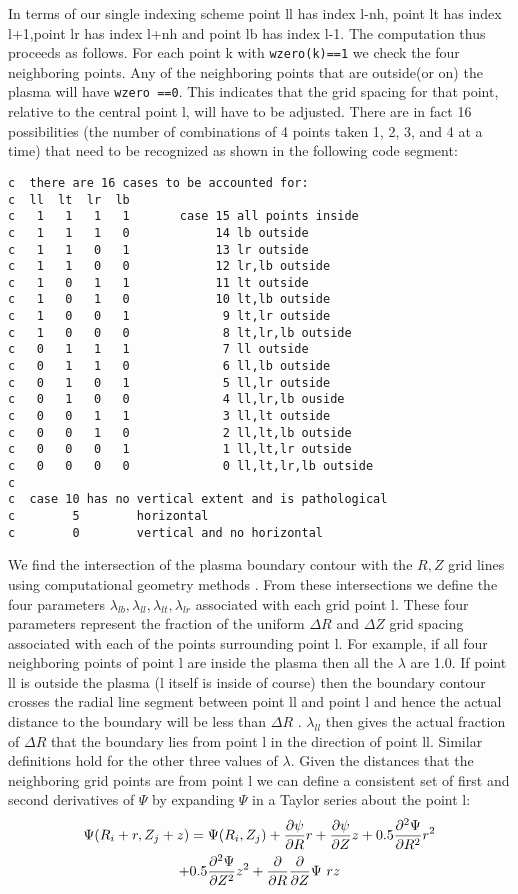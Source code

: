 In terms of our single indexing scheme point ll has
index l-nh, point lt has index l+1,point lr has index l+nh and point lb
has index l-1. The computation thus proceeds as follows. For each
point k with \texttt{wzero(k)==1} we check the four neighboring points. Any of
the neighboring points that are outside(or on)  the plasma will have
\texttt{wzero ==0}. This indicates that the grid spacing for that point,
relative to the central point l, will have to be adjusted. There are
in fact 16 possibilities (the number of combinations of 4 points
taken  1, 2, 3, and 4 at a time) that need to be recognized as shown in
the following code segment:

\tiny
\begin{verbatim}
c  there are 16 cases to be accounted for:
c  ll  lt  lr  lb
c   1   1   1   1       case 15 all points inside
c   1   1   1   0            14 lb outside
c   1   1   0   1            13 lr outside
c   1   1   0   0            12 lr,lb outside
c   1   0   1   1            11 lt outside
c   1   0   1   0            10 lt,lb outside
c   1   0   0   1             9 lt,lr outside
c   1   0   0   0             8 lt,lr,lb outside
c   0   1   1   1             7 ll outside
c   0   1   1   0             6 ll,lb outside
c   0   1   0   1             5 ll,lr outside
c   0   1   0   0             4 ll,lr,lb ouside
c   0   0   1   1             3 ll,lt outside
c   0   0   1   0             2 ll,lt,lb outside
c   0   0   0   1             1 ll,lt,lr outside
c   0   0   0   0             0 ll,lt,lr,lb outside
c
c  case 10 has no vertical extent and is pathological
c        5        horizontal
c        0        vertical and no horizontal 
\end{verbatim}
\normalsize
We find the intersection of the plasma boundary contour with the $ R,Z $ grid
lines using computational geometry methods . From these intersections we define
the four parameters
${\lambda_{lb},\lambda_{ll},\lambda_{lt},\lambda_{lr}}$
associated with each grid point l. These four parameters represent the fraction
of the uniform $ \Delta R $ and $ \Delta Z $ grid spacing associated with each
of the points surrounding point l. For example, if all four neighboring points
of point l are inside the plasma then all the $\lambda $ are 1.0. If point ll is
outside the plasma (l itself is inside of course) then the boundary contour
crosses the radial line segment between point ll and point l and hence  the
actual distance to the boundary will be less than $ \Delta R $ . $\lambda_{ll}$
then gives the actual fraction of $\Delta R$ that the boundary lies from point l
in the direction of point ll. Similar definitions hold for the other three
values of $\lambda $. Given the distances that the neighboring grid points are
from point l we can define a consistent set of first and second derivatives of
$\Psi $ by expanding $\Psi $ in a Taylor series about the point l:
\begin{multline}
 \Psi(R_i+r,Z_j+z) = \Psi(R_i,Z_j) + \frac{\partial{ \psi}}{\partial{ R}}r+
 \frac{\partial{ \psi}}{\partial{ Z}}z  + 0.5 \frac{\partial^{2}{\Psi}}{\partial{ R}^{2}}r^2\\
 +  0.5 \frac{\partial^{2}{\Psi}}{\partial{ Z}^{2}}z^2 +\frac{\partial}{\partial R}\frac{\partial}{\partial Z}\Psi \ rz\label{e1}
\end{multline}

